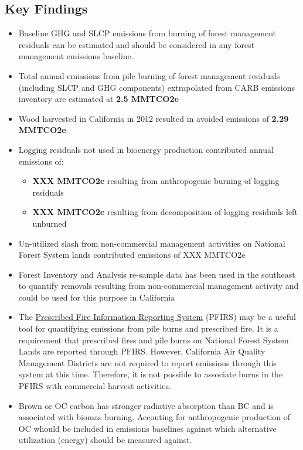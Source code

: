 \documentclass[a4paper]{article}
\begin{document}
\subsection{Key Findings}
\label{sec:orgheadline2}
\begin{itemize}
\item Baseline \ac{GHG} and \ac{SLCP} emissions from burning of forest
management residuals can be estimated and should be considered in
any forest management emissions baseline.

\item Total annual emissions from pile burning of forest management residuals
(including \ac{SLCP} and \ac{GHG} components) extrapolated from CARB emissions
inventory are estimated at \textbf{2.5 MMTCO2e}

\item Wood harvested in California in 2012 resulted in avoided emissions of
\textbf{2.29 MMTCO2e}

\item Logging residuals not used in bioenergy production contributed annual
emissions of:
\begin{itemize}
\item \textbf{XXX MMTCO2e} resulting from anthropogenic burning of logging residuals

\item \textbf{XXX MMTCO2e} resulting from decomposition of logging residuals left
unburned
\end{itemize}

\item Un-utilized slash from non-commercial management activities on
National Forest System lands contributed emissions of XXX MMTCO2e

\item Forest Inventory and Analysis re-sample data has been used in the
southeast to quantify removals resulting from non-commercial
management activity and could be used for this purpose in California

\item The \href{https://ssl.arb.ca.gov/pfirs/}{Prescribed Fire Information Reporting System} (PFIRS) may be a useful tool for quantifying
emissions from pile burns and prescribed fire. It is a requirement that prescribed fires and pile
burns on National Forest System Lands are reported through PFIRS. However, California Air Quality Management
Districts are not required to report emissions through this system at this time. Therefore, it is not possible to associate burns in the PFIRS with commercial harvest activities.

\item Brown or \ac{OC} carbon has stronger radiative absorption than \ac{BC} and is associated with biomas burning. Accouting for anthropogenic production of \ac{OC} whould be included in emissions baselines against which alternative utilization (energy) should be measured against.
\end{itemize}
\end{document}
